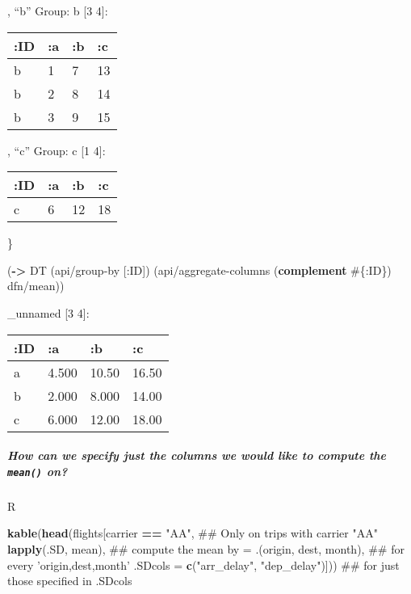 \documentclass[]{article}
\newenvironment{Shaded}{\begin{snugshade}}{\end{snugshade}}
\newcommand{\KeywordTok}[1]{\textcolor[rgb]{0.13,0.29,0.53}{\textbf{#1}}}
\newcommand{\DataTypeTok}[1]{\textcolor[rgb]{0.13,0.29,0.53}{#1}}
\newcommand{\StringTok}[1]{\textcolor[rgb]{0.31,0.60,0.02}{#1}}
\newcommand{\OperatorTok}[1]{\textcolor[rgb]{0.81,0.36,0.00}{\textbf{#1}}}
\newcommand{\AttributeTok}[1]{\textcolor[rgb]{0.77,0.63,0.00}{#1}}
\newcommand{\NormalTok}[1]{#1}
\let\oldsubparagraph\subparagraph
\renewcommand{\subparagraph}[1]{\oldsubparagraph{#1}\mbox{}}
\begin{document}
, ``b'' Group: b {[}3 4{]}:

\begin{longtable}[]{@{}llll@{}}
\toprule
:ID & :a & :b & :c\tabularnewline
\midrule
\endhead
b & 1 & 7 & 13\tabularnewline
b & 2 & 8 & 14\tabularnewline
b & 3 & 9 & 15\tabularnewline
\bottomrule
\end{longtable}

, ``c'' Group: c {[}1 4{]}:

\begin{longtable}[]{@{}llll@{}}
\toprule
:ID & :a & :b & :c\tabularnewline
\midrule
\endhead
c & 6 & 12 & 18\tabularnewline
\bottomrule
\end{longtable}

\}

\begin{Shaded}
\begin{Highlighting}[]
\NormalTok{(}\KeywordTok{->}\NormalTok{ DT}
\NormalTok{    (api/group-by [}\AttributeTok{:ID}\NormalTok{])}
\NormalTok{    (api/aggregate-columns (}\KeywordTok{complement}\NormalTok{ #\{}\AttributeTok{:ID}\NormalTok{\}) dfn/mean))}
\end{Highlighting}
\end{Shaded}

\_unnamed {[}3 4{]}:

\begin{longtable}[]{@{}llll@{}}
\toprule
:ID & :a & :b & :c\tabularnewline
\midrule
\endhead
a & 4.500 & 10.50 & 16.50\tabularnewline
b & 2.000 & 8.000 & 14.00\tabularnewline
c & 6.000 & 12.00 & 18.00\tabularnewline
\bottomrule
\end{longtable}

\subparagraph{\texorpdfstring{How can we specify just the columns we
would like to compute the \texttt{mean()}
on?}{How can we specify just the columns we would like to compute the mean() on?}}\label{how-can-we-specify-just-the-columns-we-would-like-to-compute-the-mean-on}

R

\begin{Shaded}
\begin{Highlighting}[]
\KeywordTok{kable}\NormalTok{(}\KeywordTok{head}\NormalTok{(flights[carrier }\OperatorTok{==}\StringTok{ "AA"}\NormalTok{,                         ## Only on trips with carrier "AA"}
                   \KeywordTok{lapply}\NormalTok{(.SD, mean),                       ## compute the mean}
                   \DataTypeTok{by =}\NormalTok{ .(origin, dest, month),             ## for every 'origin,dest,month'}
                   \DataTypeTok{.SDcols =} \KeywordTok{c}\NormalTok{(}\StringTok{"arr_delay"}\NormalTok{, }\StringTok{"dep_delay"}\NormalTok{)])) ## for just those specified in .SDcols}
\end{Highlighting}
\end{Shaded}
\end{document}
